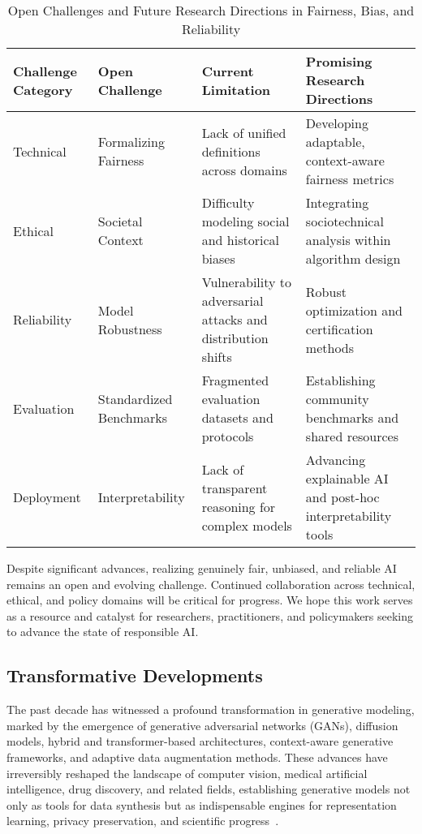 \documentclass[sigconf]{acmart}
\begin{document}
\begin{table*}[htbp]
\centering
\caption{Open Challenges and Future Research Directions in Fairness, Bias, and Reliability}
\label{tab:open_challenges}
\begin{adjustbox}{max width=\textwidth}
\begin{tabular}{@{}llll@{}}
\toprule
Challenge Category & Open Challenge & Current Limitation & Promising Research Directions \\
\midrule
Technical & Formalizing Fairness & Lack of unified definitions across domains & Developing adaptable, context-aware fairness metrics \\
Ethical & Societal Context & Difficulty modeling social and historical biases & Integrating sociotechnical analysis within algorithm design \\
Reliability & Model Robustness & Vulnerability to adversarial attacks and distribution shifts & Robust optimization and certification methods \\
Evaluation & Standardized Benchmarks & Fragmented evaluation datasets and protocols & Establishing community benchmarks and shared resources \\
Deployment & Interpretability & Lack of transparent reasoning for complex models & Advancing explainable AI and post-hoc interpretability tools \\
\bottomrule
\end{tabular}
\end{adjustbox}
\end{table*}

Despite significant advances, realizing genuinely fair, unbiased, and reliable AI remains an open and evolving challenge. Continued collaboration across technical, ethical, and policy domains will be critical for progress. We hope this work serves as a resource and catalyst for researchers, practitioners, and policymakers seeking to advance the state of responsible AI.

\subsection{Transformative Developments}

The past decade has witnessed a profound transformation in generative modeling, marked by the emergence of generative adversarial networks (GANs), diffusion models, hybrid and transformer-based architectures, context-aware generative frameworks, and adaptive data augmentation methods. These advances have irreversibly reshaped the landscape of computer vision, medical artificial intelligence, drug discovery, and related fields, establishing generative models not only as tools for data synthesis but as indispensable engines for representation learning, privacy preservation, and scientific progress~\cite{ref74,ref75,ref81,ref82,ref90,ref91,ref92,ref93,ref94,ref95,ref96,ref97,ref98,ref99,ref100,ref101,ref102}.
\end{document}
